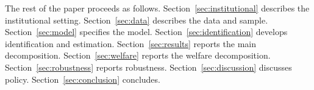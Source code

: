 The rest of the paper proceeds as follows. Section~\ref{sec:institutional} describes the institutional setting. Section~\ref{sec:data} describes the data and sample. Section~\ref{sec:model} specifies the model. Section~\ref{sec:identification} develops identification and estimation. Section~\ref{sec:results} reports the main decomposition. Section~\ref{sec:welfare} reports the welfare decomposition. Section~\ref{sec:robustness} reports robustness. Section~\ref{sec:discussion} discusses policy. Section~\ref{sec:conclusion} concludes.
